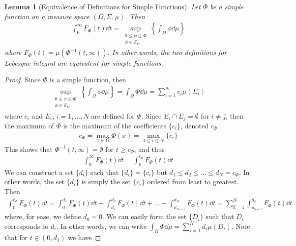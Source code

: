 \documentclass[12pt]{article}
\theoremstyle{plain}
\newtheorem{lemma}{Lemma}
\begin{document}
\begin{lemma}[Equivalence of Definitions for Simple Functions]
    Let $\Phi$ be a simple function on a measure space $(\Omega, \Sigma, \mu)$.  Then
    \begin{align*}
        \int_0^\infty F_\Phi(t) \dd t = \sup_{\substack{0 \leq \phi \leq \Phi \\[.05cm] \phi \in \mathcal{S}_\Omega}} \left\{\int_\Omega \phi \dd \mu\right\}
    \end{align*}
    where $F_\Phi(t) = \mu(\Phi^{-1}(t, \infty))$.  In other words, the two definitions for Lebesgue integral are equivalent for simple functions.
\end{lemma}
\begin{proof}
    Since $\Phi$ is a simple function, then
    \begin{align*}
        \sup_{\substack{0 \leq \phi \leq \Phi \\[.05cm] \phi \in \mathcal{S}_\Omega}}\left\{\int_\Omega \phi \dd \mu\right\} = \int_\Omega \Phi \dd \mu = \sum_{i = 1}^N c_i \mu(E_i)
    \end{align*}
    where $c_i$ and $E_i$, $i = 1, \dots, N$ are defined for $\Phi$.  Since $E_i \cap  E_j = \emptyset$ for $i \neq j$, then the maximum of $\Phi$ is the maximum of the coefficients $\{c_i\}$, denoted $c_\Phi$.
    \begin{align*}
        c_\Phi = \max_{x \in \Omega} \Phi(x) = \max_{1 \leq i \leq N} \{c_i\}
    \end{align*}
    This shows that $\Phi^{-1}(t, \infty) = \emptyset$ for $t \geq c_\Phi$, and thus
    \begin{align*}
        \int_0^\infty F_\Phi(t) \dd t = \int_0^{c_\Phi} F_\Phi(t) \dd t
    \end{align*}
    We can construct a set $\{d_i\}$ such that $\{d_i\} = \{c_i\}$ but $d_1 \leq d_2 \leq \dots \leq d_N = c_\Phi$.  In other words, the set $\{d_i\}$ is simply the set $\{c_i\}$ ordered from least to greatest.  Then
    \begin{align*}
        \int_0^{c_\Phi} F_\Phi(t) \dd t = \int_0^{d_1} F_\Phi(t) \dd t + \int_{d_1}^{d_2} F_\Phi(t) \dd t + \dots + \int_{d_{N-1}}^{d_N} F_\Phi(t) \dd t = \sum_{k = 1}^N \int_{d_{k - 1}}^{d_k} F_\Phi(t) \dd t
    \end{align*}
    where, for ease, we define $d_0 = 0$.  We can easily form the set $\{D_i\}$ such that $D_i$ corresponds to $d_i$.  In other words, we can write $\int_\Omega \Phi \dd \mu = \sum_{i=1}^N d_i \mu(D_i)$.  Note that for $t \in (0, d_1)$ we have

\end{proof}
\end{document}
